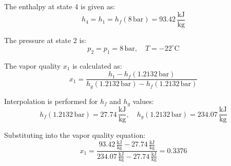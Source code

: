 The enthalpy at state 4 is given as:  
\[
h_4 = h_1 = h_f(8 \, \text{bar}) = 93.42 \, \frac{\text{kJ}}{\text{kg}}
\]  

The pressure at state 2 is:  
\[
p_2 = p_1 = 8 \, \text{bar}, \quad T = -22^\circ\text{C}
\]  

The vapor quality \( x_1 \) is calculated as:  
\[
x_1 = \frac{h_1 - h_f(1.2132 \, \text{bar})}{h_g(1.2132 \, \text{bar}) - h_f(1.2132 \, \text{bar})}
\]  

Interpolation is performed for \( h_f \) and \( h_g \) values:  
\[
h_f(1.2132 \, \text{bar}) = 27.74 \, \frac{\text{kJ}}{\text{kg}}, \quad h_g(1.2132 \, \text{bar}) = 234.07 \, \frac{\text{kJ}}{\text{kg}}
\]  

Substituting into the vapor quality equation:  
\[
x_1 = \frac{93.42 \, \frac{\text{kJ}}{\text{kg}} - 27.74 \, \frac{\text{kJ}}{\text{kg}}}{234.07 \, \frac{\text{kJ}}{\text{kg}} - 27.74 \, \frac{\text{kJ}}{\text{kg}}} = 0.3376
\]